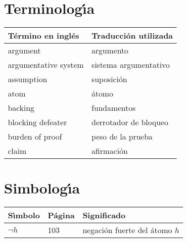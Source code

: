 \section{Terminolog\'{\i}a}

\begin{longtable}{|l|l|} \hline
\textbf{T\'ermino en ingl\'es} & \textbf{Traducci\'on utilizada}
\\ \hline \hline argument & argumento \\ \hline argumentative
system & sistema argumentativo\\ \hline assumption & suposici\'on
\\ \hline atom & \'atomo \\ \hline backing & fundamentos\\ \hline
blocking defeater & derrotador de bloqueo \\ \hline burden of
proof & peso de la prueba \\ \hline claim & afirmaci\'on  \\ \hline
\end{longtable}

\section{Simbolog\'{\i}a}

\begin{longtable}{|l|l|p{9cm}|}\hline
\textbf{S\'{\i}mbolo} & \textbf{P\'agina} & \textbf{Significado}\\
\hline\hline 
$\neg h$ & 103& negaci\'on fuerte del \'atomo $h$\\
\end{longtable}

